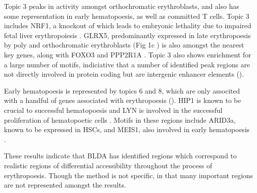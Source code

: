 Topic 3 peaks in activity amongst orthochromatic erythroblasts, and also has some representation in early hematopoesis, as well as committed T cells. Topic 3 includes NRF1, a knockout of which leads to embryonic lethality due to impaired fetal liver erythropoiesis \cite{Chen2001}. GLRX5, predominantly expressed in late erythropoesis by poly and orthochromatic erythroblasts (Fig 1c \cite{Pishesha2014}) is also amongst the nearest key genes, along with FOXO3 and PPP2R1A \cite{Mello2019}. Topic 3 also shows enrichment for a large number of motifs, indiciative that a number of identified peak regions are not directly involved in protein coding but are intergenic enhancer elements ().

Early hematopoesis is represented by topics 6 and 8, which are only associted with a handful of genes associated with erythropoesis (). HIP1 is known to be crucial to successful hematopoesis and LYN is involved in the successful proliferation of hematopoetic cells \cite{Oravecz-Wilson2004, OLaughlin-Bunner2001}. Motifs in these regions include ARID3a, known to be expressed in HSCs, and MEIS1, also involved in early hematopoesis \cite{Zeddies2014,Miller2016, Ratliff2020}. 

These results indicate that BLDA has identified regions which correspond to realistic regions of differential accessibility throughout the process of erythropoesis. Though the method is not specific, in that many important regions are not represented amongst the results.  











